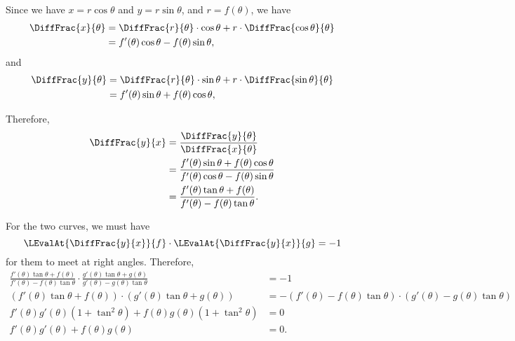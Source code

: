 \Question{\currfilebase}

Since we have \(x = r \cos \theta\) and \(y = r \sin \theta\), and \(r = f(\theta)\), we have
\begin{align*}
    \DiffFrac{x}{\theta} & = \DiffFrac{r}{\theta} \cdot \cos \theta + r \cdot \DiffFrac{\cos \theta}{\theta} \\
                         & = f'(\theta) \cos \theta - f(\theta) \sin \theta,
\end{align*}
and
\begin{align*}
    \DiffFrac{y}{\theta} & = \DiffFrac{r}{\theta} \cdot \sin \theta + r \cdot \DiffFrac{\sin \theta}{\theta} \\
                         & = f'(\theta) \sin \theta + f(\theta) \cos \theta,
\end{align*}

Therefore,
\begin{align*}
    \DiffFrac{y}{x} & = \frac{\DiffFrac{y}{\theta}}{\DiffFrac{x}{\theta}}                                                     \\
                    & = \frac{f'(\theta) \sin \theta + f(\theta) \cos \theta}{f'(\theta) \cos \theta - f(\theta) \sin \theta} \\
                    & = \frac{f'(\theta) \tan \theta + f(\theta)}{f'(\theta) - f(\theta) \tan \theta}.
\end{align*}

For the two curves, we must have
\[
    \LEvalAt{\DiffFrac{y}{x}}{f} \cdot \LEvalAt{\DiffFrac{y}{x}}{g} = -1
\]
for them to meet at right angles. Therefore,
\begin{align*}
    \frac{f'(\theta) \tan \theta + f(\theta)}{f'(\theta) - f(\theta) \tan \theta} \cdot
    \frac{g'(\theta) \tan \theta + g(\theta)}{g'(\theta) - g(\theta) \tan \theta}                         & = -1                                                                                                     \\
    \left(f'(\theta) \tan \theta + f(\theta)\right) \cdot \left(g'(\theta) \tan \theta + g(\theta)\right) & = -\left(f'(\theta) - f(\theta) \tan \theta\right) \cdot \left(g'(\theta) - g(\theta) \tan \theta\right) \\
    f'(\theta) g'(\theta) (1 + \tan^2\theta) + f(\theta) g(\theta) (1 + \tan^2\theta)                     & = 0                                                                                                      \\
    f'(\theta) g'(\theta) + f(\theta) g(\theta)                                                           & = 0.
\end{align*}

